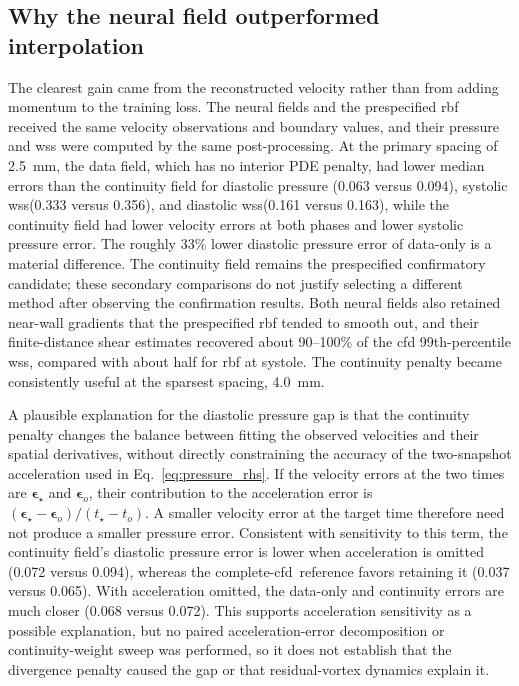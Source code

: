 \documentclass[12pt,a4paper]{article}
\newcommand{\CFD}{\ac{cfd}\xspace}
\newcommand{\WSS}{\ac{wss}\xspace}
\newcommand{\RBF}{\ac{rbf}\xspace}
\theoremstyle{definition}
\numberwithin{equation}{section}
\providecommand{\DIFaddtex}[1]{{\protect\color{blue} \sf #1}} %
\providecommand{\DIFdeltex}[1]{{\protect\color{red} \scriptsize #1}} %
\providecommand{\DIFaddbegin}{} %
\providecommand{\DIFaddend}{} %
\providecommand{\DIFdelbegin}{} %
\providecommand{\DIFdelend}{} %
\providecommand{\DIFadd}[1]{\texorpdfstring{\DIFaddtex{#1}}{#1}} %
\providecommand{\DIFdel}[1]{\texorpdfstring{\DIFdeltex{#1}}{}} %
\newcommand{\DIFscaledelfig}{0.5}
\newlength{\DIFdelgraphicswidth} %
\newlength{\DIFdelgraphicsheight} %
\newcommand{\DIFaddincludegraphics}[2][]{{\color{blue}\fbox{\DIFOincludegraphics[#1]{#2}}}} %
\newcommand{\DIFdelincludegraphics}[2][]{%
\sbox{\DIFdelgraphicsbox}{\DIFOincludegraphics[#1]{#2}}%
\settoboxwidth{\DIFdelgraphicswidth}{\DIFdelgraphicsbox} %
\settoboxtotalheight{\DIFdelgraphicsheight}{\DIFdelgraphicsbox} %
\scalebox{\DIFscaledelfig}{%
\parbox[b]{\DIFdelgraphicswidth}{\usebox{\DIFdelgraphicsbox}\\[-\baselineskip] \rule{\DIFdelgraphicswidth}{0em}}\llap{\resizebox{\DIFdelgraphicswidth}{\DIFdelgraphicsheight}{%
\setlength{\unitlength}{\DIFdelgraphicswidth}%
\begin{picture}(1,1)%
\thicklines\linethickness{2pt} %
{\color[rgb]{1,0,0}\put(0,0){\framebox(1,1){}}}%
{\color[rgb]{1,0,0}\put(0,0){\line( 1,1){1}}}%
{\color[rgb]{1,0,0}\put(0,1){\line(1,-1){1}}}%
\end{picture}%
}\hspace*{3pt}}} %
} %
\DeclareRobustCommand{\DIFaddbegin}{\DIFOaddbegin \let\includegraphics\DIFaddincludegraphics} %
\DeclareRobustCommand{\DIFaddend}{\DIFOaddend \let\includegraphics\DIFOincludegraphics} %
\DeclareRobustCommand{\DIFdelbegin}{\DIFOdelbegin \let\includegraphics\DIFdelincludegraphics} %
\DeclareRobustCommand{\DIFdelend}{\DIFOaddend \let\includegraphics\DIFOincludegraphics} %
\renewcommand{\DIFaddtex}[1]{{\protect\color{red}#1}}
\renewcommand{\DIFdeltex}[1]{}
\renewcommand{\DIFdel}[1]{}
\renewcommand{\DIFaddincludegraphics}[2][]{\DIFOincludegraphics[#1]{#2}}
\renewcommand{\DIFdelincludegraphics}[2][]{}
\def\DIFaddbegin{}\def\DIFaddend{}%
\def\DIFdelbegin{}\def\DIFdelend{}%
\begin{document}
\subsection{Why the neural field outperformed interpolation}
The clearest gain came from the reconstructed velocity rather than from adding momentum to the training loss. The neural fields and the prespecified \RBF received the same velocity observations and boundary values, and their pressure and \WSS were computed by the same post-processing. \DIFdelbegin \DIFdel{Yet the }\DIFdelend \DIFaddbegin \DIFadd{At the primary spacing of 2.5~mm, the }\DIFaddend data field, which has no interior PDE penalty, \DIFdelbegin \DIFdel{performed close to }\DIFdelend \DIFaddbegin \DIFadd{had lower median errors than }\DIFaddend the continuity field \DIFdelbegin \DIFdel{at 1.5 and 2.5~mm. }\DIFdelend \DIFaddbegin \DIFadd{for diastolic pressure (0.063 versus 0.094), systolic }\WSS \DIFadd{(0.333 versus 0.356), and diastolic }\WSS \DIFadd{(0.161 versus 0.163), while the continuity field had lower velocity errors at both phases and lower systolic pressure error. The roughly 33\% lower diastolic pressure error of data-only is a material difference. The continuity field remains the prespecified confirmatory candidate; these secondary comparisons do not justify selecting a different method after observing the confirmation results. }\DIFaddend Both neural fields also retained near-wall gradients that the prespecified \RBF tended to smooth out, and their finite-distance shear estimates recovered about 90--100\% of the \CFD 99th-percentile \WSS, compared with about half for \RBF at systole. The continuity penalty became consistently useful at the sparsest spacing, 4.0~mm.

\DIFaddbegin \DIFadd{A plausible explanation for the diastolic pressure gap is that the continuity penalty changes the balance between fitting the observed velocities and their spatial derivatives, without directly constraining the accuracy of the two-snapshot acceleration used in Eq.~\eqref{eq:pressure_rhs}. If the velocity errors at the two times are $\boldsymbol\epsilon_\star$ and $\boldsymbol\epsilon_o$, their contribution to the acceleration error is $(\boldsymbol\epsilon_\star-\boldsymbol\epsilon_o)/(t_\star-t_o)$. A smaller velocity error at the target time therefore need not produce a smaller pressure error. Consistent with sensitivity to this term, the continuity field's diastolic pressure error is lower when acceleration is omitted (0.072 versus 0.094), whereas the complete-}\CFD{}\ \DIFadd{reference favors retaining it (0.037 versus 0.065). With acceleration omitted, the data-only and continuity errors are much closer (0.068 versus 0.072). This supports acceleration sensitivity as a possible explanation, but no paired acceleration-error decomposition or continuity-weight sweep was performed, so it does not establish that the divergence penalty caused the gap or that residual-vortex dynamics explain it.
}
\end{document}
